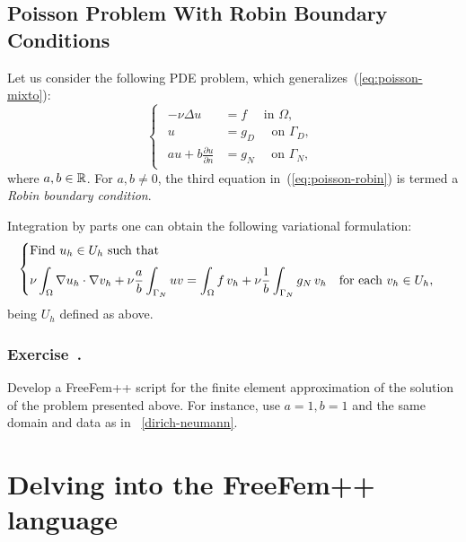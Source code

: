 \documentclass[12pt]{article}
\newcounter{exercise}
\newenvironment{exercise}{%
  \stepcounter{exercise}
  \subsubsection*{Exercise~\theexercise.}}
{}
\begin{document}


\subsection{Poisson Problem With Robin Boundary Conditions}

Let us consider the following PDE problem, which generalizes~(\ref{eq:poisson-mixto}):
\begin{equation}
  \label{eq:poisson-robin}
  \begin{cases}
    \begin{aligned}
      -\nu\Delta u &= f \quad \text{ in } \Omega, \\
      u &= g_D \quad \text{ on } \Gamma_D, \\
      au + b \frac{\partial u}{\partial n} &= g_N \quad \text{ on } \Gamma_N,
    \end{aligned}
  \end{cases}
\end{equation}
where $a,b\in{\mathbb R}$. For $a,b\neq 0$, the third equation
in~(\ref{eq:poisson-robin}) is termed a \textit{Robin boundary
  condition}.

Integration by parts one can obtain the following variational formulation:
\begin{equation*}
  \begin{cases}
    \text{Find $u_h\in U_{h}$ such that}
    \\\noalign{\medskip}
    \begin{aligned}
      \nu\int_\Omega \nabla u_h \cdot \nabla v_h
      + \nu\frac a b \int_{\Gamma_N} u v
      = \int_\Omega f\, v_h
      + \nu \frac 1b \int_{\Gamma_N} g_N\, v_h
      \quad\text{for each } v_h\in U_{h},
    \end{aligned}
  \end{cases}
\end{equation*}
being $U_h$ defined as above.

\begin{exercise}
  Develop a FreeFem++ script for the finite element approximation of
  the solution of the problem presented above. For instance, use
  $a=1, b=1$ and the same domain and data as in
  \lstlistingname~\ref{dirich-neumann}.
\end{exercise}

\section{Delving into the FreeFem++ language}
\label{sec:delv-into-freef}
\end{document}
